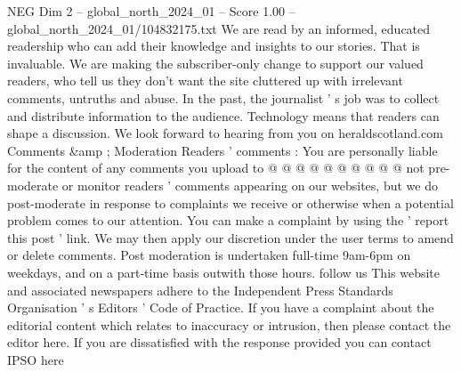 \begin{textsample}{NEG Dim 2 – global\_north\_2024\_01 – Score 1.00 – global\_north\_2024\_01/104832175.txt}
We are read by an informed, educated readership who can add their knowledge and insights to our stories.
That is invaluable.
We are making the subscriber-only change to support our valued readers, who tell us they don't want the site cluttered up with irrelevant comments, untruths and abuse.
In the past, the journalist ' s job was to collect and distribute information to the audience.
Technology means that readers can shape a discussion.
We look forward to hearing from you on heraldscotland.com Comments \&amp ; Moderation Readers ' comments : You are personally liable for the content of any comments you upload to @ @ @ @ @ @ @ @ @ @ not pre-moderate or monitor readers ' comments appearing on our websites, but we do post-moderate in response to complaints we receive or otherwise when a potential problem comes to our attention.
You can make a complaint by using the ' report this post ' link.
We may then apply our discretion under the user terms to amend or delete comments.
Post moderation is undertaken full-time 9am-6pm on weekdays, and on a part-time basis outwith those hours. follow us This website and associated newspapers adhere to the Independent Press Standards Organisation ' s Editors ' Code of Practice.
If you have a complaint about the editorial content which relates to inaccuracy or intrusion, then please contact the editor here.
If you are dissatisfied with the response provided you can contact IPSO here

\end{textsample}
